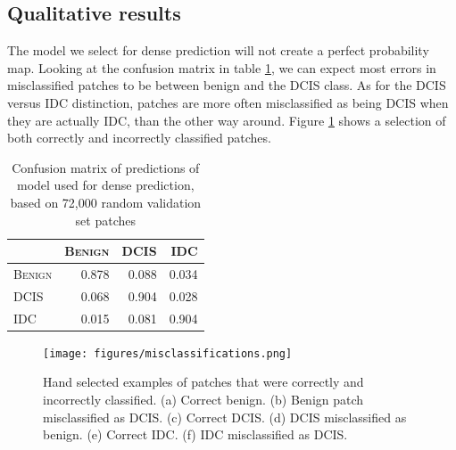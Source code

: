 \documentclass[journal]{IEEEtran}
\begin{document}
\subsection{Qualitative results}
The model we select for dense prediction will not create a perfect probability map. Looking at the confusion matrix in table \ref{table_confusion_768}, we can expect most errors in misclassified patches to be between benign and the DCIS class. As for the DCIS versus IDC distinction, patches are more often misclassified as being DCIS when they are actually IDC, than the other way around. Figure \ref{fig_misclassifications} shows a selection of both correctly and incorrectly classified patches.

\begin{table}[h]
\renewcommand{\arraystretch}{1.21}
\caption{Confusion matrix of predictions of model used for dense prediction, based on 72,000 random validation set patches }
\label{table_confusion_768}
\centering
\begin{tabular}{|l|rrr|}
\hline
\textsc{}&\textsc{Benign}&\textsc{DCIS}&\textsc{IDC}\\
\hline
\textsc{Benign}&0.878&0.088&0.034\\
\textsc{DCIS}&0.068& 0.904&0.028\\
\textsc{IDC}&0.015& 0.081&0.904\\
\hline

\end{tabular}
\end{table}

\begin{figure}[!t]
\vspace{-0.435cm}
\centering{}
\hspace{-0.1cm}\texttt{[image: figures/misclassifications.png]}
\vspace{-0.55cm}\caption{Hand selected examples of patches that were correctly and incorrectly classified. (a) Correct benign. (b) Benign patch misclassified as DCIS. (c) Correct DCIS. (d) DCIS misclassified as benign. (e) Correct IDC. (f) IDC misclassified as DCIS. }
\label{fig_misclassifications}
\end{figure}
\end{document}

